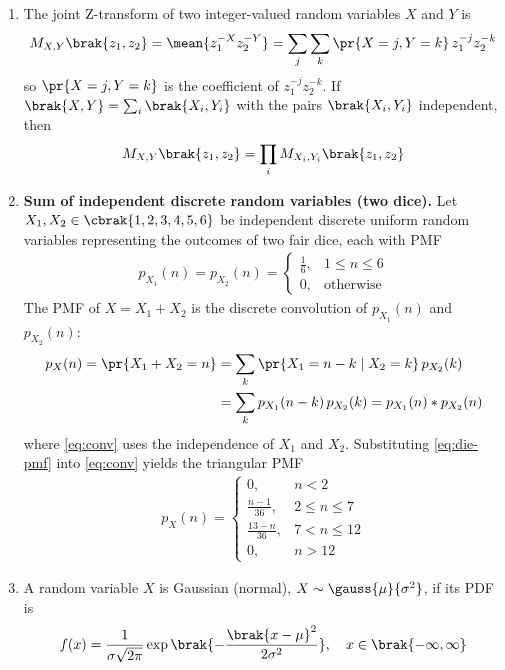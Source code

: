 \begin{enumerate}[label=\thesubsection.\arabic*, ref=\thesubsection.\theenumi]
\item The joint Z-transform of two integer-valued random variables $X$ and
$Y$ is
\begin{align}
M_{X,Y}\brak{z_1, z_2} = \mean{z_1^{-X} z_2^{-Y}}
= \sum_{j}\sum_{k} \pr{X = j, Y = k}\, z_1^{-j} z_2^{-k}
\label{eq:ztrans-joint}
\end{align}
so $\pr{X = j, Y = k}$ is the coefficient of $z_1^{-j} z_2^{-k}$. If
$\brak{X, Y} = \sum_i \brak{X_i, Y_i}$ with the pairs $\brak{X_i, Y_i}$
independent, then
\begin{align}
M_{X,Y}\brak{z_1, z_2} = \prod_{i} M_{X_i,Y_i}\brak{z_1, z_2}
\label{eq:ztrans-joint-prod}
\end{align}

\item \textbf{Sum of independent discrete random variables (two dice).}
Let $X_1, X_2 \in \cbrak{1, 2, 3, 4, 5, 6}$ be independent discrete uniform
random variables representing the outcomes of two fair dice, each with PMF
\begin{align}
p_{X_1}(n) = p_{X_2}(n) =
\begin{cases}
\frac{1}{6}, & 1 \le n \le 6 \\
0, & \text{otherwise}
\end{cases}
\label{eq:die-pmf}
\end{align}
The PMF of $X = X_1 + X_2$ is the discrete convolution of $p_{X_1}(n)$ and
$p_{X_2}(n)$:
\begin{align}
p_X(n) = \pr{X_1 + X_2 = n}
&= \sum_{k} \pr{X_1 = n - k \mid X_2 = k}\, p_{X_2}(k)
\label{eq:conv-cond} \\
&= \sum_{k} p_{X_1}(n - k)\, p_{X_2}(k) = p_{X_1}(n) * p_{X_2}(n)
\label{eq:conv}
\end{align}
where \eqref{eq:conv} uses the independence of $X_1$ and $X_2$.
Substituting \eqref{eq:die-pmf} into \eqref{eq:conv} yields the triangular PMF
\begin{align}
p_X(n) =
\begin{cases}
0, & n < 2 \\
\frac{n - 1}{36}, & 2 \le n \le 7 \\
\frac{13 - n}{36}, & 7 < n \le 12 \\
0, & n > 12
\end{cases}
\label{eq:dice-sum-pmf}
\end{align}

\item A random variable $X$ is Gaussian (normal), $X \sim \gauss{\mu}{\sigma^2}$,
if its PDF is
\begin{align}
f(x) = \frac{1}{\sigma\sqrt{2\pi}}
\exp\brak{-\frac{\brak{x - \mu}^2}{2\sigma^2}}, \quad
x \in \brak{-\infty, \infty}
\label{eq:gauss-pdf}
\end{align}


\end{enumerate}
